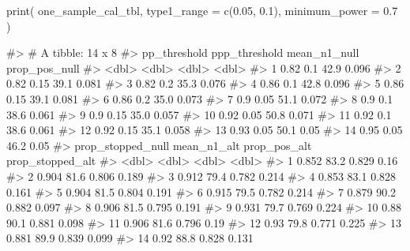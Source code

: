 \begin{Schunk}
\begin{Sinput}
print(
  one_sample_cal_tbl,
  type1_range = c(0.05, 0.1),
  minimum_power = 0.7
  )
\end{Sinput}
\begin{Soutput}
#> # A tibble: 14 x 8
#>    pp_threshold ppp_threshold mean_n1_null prop_pos_null
#>           <dbl>         <dbl>        <dbl>         <dbl>
#>  1         0.82          0.1          42.9         0.096
#>  2         0.82          0.15         39.1         0.081
#>  3         0.82          0.2          35.3         0.076
#>  4         0.86          0.1          42.8         0.096
#>  5         0.86          0.15         39.1         0.081
#>  6         0.86          0.2          35.0         0.073
#>  7         0.9           0.05         51.1         0.072
#>  8         0.9           0.1          38.6         0.061
#>  9         0.9           0.15         35.0         0.057
#> 10         0.92          0.05         50.8         0.071
#> 11         0.92          0.1          38.6         0.061
#> 12         0.92          0.15         35.1         0.058
#> 13         0.93          0.05         50.1         0.05 
#> 14         0.95          0.05         46.2         0.05 
#>    prop_stopped_null mean_n1_alt prop_pos_alt prop_stopped_alt
#>                <dbl>       <dbl>        <dbl>            <dbl>
#>  1             0.852        83.2        0.829            0.16 
#>  2             0.904        81.6        0.806            0.189
#>  3             0.912        79.4        0.782            0.214
#>  4             0.853        83.1        0.828            0.161
#>  5             0.904        81.5        0.804            0.191
#>  6             0.915        79.5        0.782            0.214
#>  7             0.879        90.2        0.882            0.097
#>  8             0.906        81.5        0.795            0.191
#>  9             0.931        79.7        0.769            0.224
#> 10             0.88         90.1        0.881            0.098
#> 11             0.906        81.6        0.796            0.19 
#> 12             0.93         79.8        0.771            0.225
#> 13             0.881        89.9        0.839            0.099
#> 14             0.92         88.8        0.828            0.131
\end{Soutput}
\end{Schunk}

